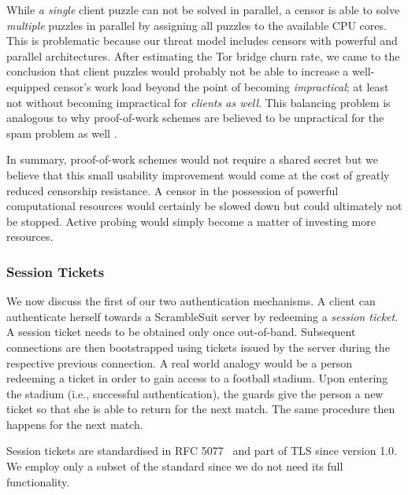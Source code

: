 \documentclass{sig-alternate}
\newcommand{\pt}{\textsf{ScrambleSuit}}
\numberwithin{enumi}{section}
\numberwithin{notesctr}{section}
\begin{document}
While \emph{a single} client puzzle can not be solved in parallel, a censor is able to solve
\emph{multiple} puzzles in parallel by assigning all puzzles to the available CPU cores. This is
problematic because our threat model includes censors with powerful and parallel architectures.
After estimating the Tor bridge churn rate, we came to the conclusion that client puzzles would
probably not be able to increase a well-equipped censor's work load beyond the point of becoming
\emph{impractical}; at least not without becoming impractical for \emph{clients as well}. This
balancing problem is analogous to why proof-of-work schemes are believed to be unpractical for the
spam problem as well \cite{Laurie2004}.

In summary, proof-of-work schemes would not require a shared secret but we believe that this small
usability improvement would come at the cost of greatly reduced censorship resistance. A censor in
the possession of powerful computational resources would certainly be slowed down but could
ultimately not be stopped. Active probing would simply become a matter of investing more resources.


\subsubsection{Session Tickets}
\label{sec:tickets}
We now discuss the first of our two authentication mechanisms. A client can authenticate herself
towards a \pt{} server by redeeming a \emph{session ticket}. A session ticket needs to be obtained
only once out-of-band. Subsequent connections are then bootstrapped using tickets issued by the
server during the respective previous connection. A real world analogy would be a person redeeming a
ticket in order to gain access to a football stadium. Upon entering the stadium (i.e., successful
authentication), the guards give the person a new ticket so that she is able to return for the next
match. The same procedure then happens for the next match.

Session tickets are standardised in RFC 5077~\cite{rfc5077} and part of TLS since version 1.0. We
employ only a subset of the standard since we do not need its full functionality.
\end{document}
